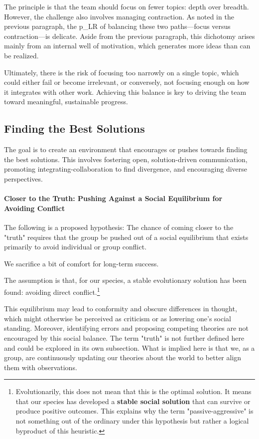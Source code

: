 The principle is that the team should focus on fewer topics: depth over breadth. However, the challenge also involves managing contraction. As noted in the previous paragraph, the \gls{p_LR} of balancing these two paths—focus versus contraction—is delicate. Aside from the previous paragraph, this dichotomy arises mainly from an internal well of motivation, which generates more ideas than can be realized.

Ultimately, there is the risk of focusing too narrowly on a single topic, which could either fail or become irrelevant, or conversely, not focusing enough on how it integrates with other work. Achieving this balance is key to driving the team toward meaningful, sustainable progress.

\subsection{Finding the Best Solutions} \label{responsibility__finding}
The goal is to create an environment that encourages or pushes towards finding the best solutions. This involves fostering open, solution-driven communication, promoting integrating-collaboration to find divergence, and encouraging diverse perspectives.

\paragraph{Closer to the Truth: Pushing Against a Social Equilibrium for Avoiding Conflict}

The following is a proposed hypothesis: The chance of coming closer to the "truth" requires that the group be pushed out of a social equilibrium that exists primarily to avoid individual or group conflict.

\begin{center} We sacrifice a bit of comfort for long-term success. \end{center}

The assumption is that, for our species, a stable evolutionary solution has been found: avoiding direct conflict.\footnote{
	Evolutionarily, this does not mean that this is the optimal solution. It means that our species has developed a \textbf{stable social solution} that can survive or produce positive outcomes. This explains why the term "passive-aggressive" is not something out of the ordinary under this hypothesis but rather a logical byproduct of this heuristic.
}

This equilibrium may lead to conformity and obscure differences in thought, which might otherwise be perceived as criticism or as lowering one's social standing. Moreover, identifying errors and proposing competing theories are not encouraged by this social balance. The term "truth" is not further defined here and could be explored in its own subsection. What is implied here is that we, as a group, are continuously updating our theories about the world to better align them with observations.

